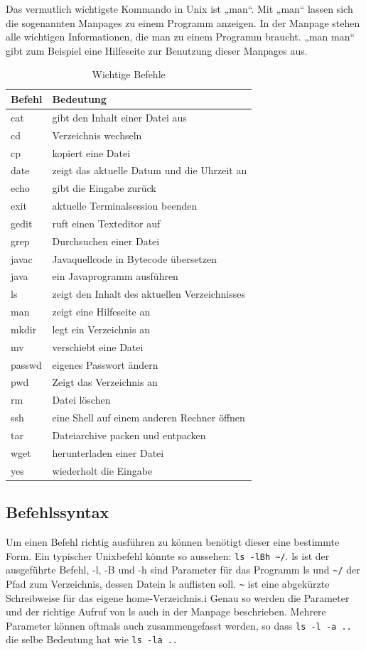 Das vermutlich wichtigste Kommando in Unix ist „man“. Mit „man“ lassen sich die sogenannten Manpages zu einem Programm anzeigen. In der Manpage stehen alle wichtigen Informationen, die man zu einem Programm braucht.
„man man“ gibt zum Beispiel eine Hilfeseite zur Benutzung dieser Manpages aus.

\begin{table}
\centering
\begin{tabular}{l|l}
Befehl & Bedeutung \\ \hline
cat & gibt den Inhalt einer Datei aus \\
cd & Verzeichnis wechseln \\
cp & kopiert eine Datei \\
date & zeigt das aktuelle Datum und die Uhrzeit an \\
echo & gibt die Eingabe zurück \\
exit & aktuelle Terminalsession beenden \\
gedit & ruft einen Texteditor auf \\
grep & Durchsuchen einer Datei \\
javac & Javaquellcode in Bytecode übersetzen \\
java & ein Javaprogramm ausführen \\
ls & zeigt den Inhalt des aktuellen Verzeichnisses \\
man & zeigt eine Hilfeseite an \\
mkdir & legt ein Verzeichnis an \\
mv & verschiebt eine Datei \\
passwd & eigenes Passwort ändern \\
pwd & Zeigt das Verzeichnis an \\
rm & Datei löschen \\
ssh & eine Shell auf einem anderen Rechner öffnen \\
tar & Dateiarchive packen und entpacken \\
wget & herunterladen einer Datei \\
yes & wiederholt die Eingabe
\end{tabular}
\label{Befehle}
\caption{Wichtige Befehle}
\end{table}

\subsection{Befehlssyntax}
Um einen Befehl richtig ausführen zu können benötigt dieser eine bestimmte Form. Ein typischer Unixbefehl könnte so aussehen:
\lstinline$ls -lBh ~/$. ls ist der ausgeführte Befehl, -l, -B und -h sind Parameter für das Programm ls und \lstinline$~/$ der Pfad zum Verzeichnis, dessen Datein ls auflisten soll. \lstinline$~$ ist eine abgekürzte Schreibweise für das eigene home-Verzeichnis.i
Genau so werden die Parameter und der richtige Aufruf von ls auch in der Manpage beschrieben. Mehrere Parameter können oftmals auch zusammengefasst werden, so dass \lstinline$ls -l -a ..$ die selbe Bedeutung hat wie \lstinline$ls -la ..$

